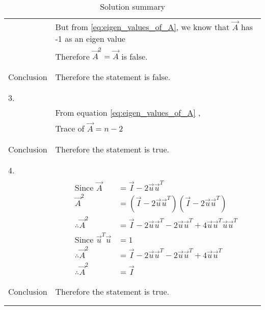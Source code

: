 \documentclass[journal,12pt]{IEEEtran}
\begin{document}
\begin{longtable}{|l|l|}
&But from \eqref{eq:eigen_values_of_A}, we know that $\vec{A}$ has -1 as an eigen value\\
&Therefore $\vec{A}^2=\vec{A}$ is false.\\
&\\
\hline
&\\
Conclusion&Therefore the statement is false.\\
&\\
\hline
&\\
3.&\\
& From equation \eqref{eq:eigen_values_of_A} ,\\
&Trace of $\vec{A}=n-2$\\
&\\
\hline
&\\
Conclusion&Therefore the statement is true.\\
&\\
\hline
&\\
4.&\\
&\parbox{6cm}{\begin{align*}
    \mbox{Since }\vec{A}&=\vec{I}-2\vec{u}\vec{u}^T\\
    \vec{A}^2&=(\vec{I}-2\vec{u}\vec{u}^T)(\vec{I}-2\vec{u}\vec{u}^T)\\
    \therefore\vec{A}^2&=\vec{I}-2\vec{u}\vec{u}^T-2\vec{u}\vec{u}^T+4\vec{u}\vec{u}^T\vec{u}\vec{u}^T\\
    \mbox{Since }\vec{u}^T\vec{u}&=1\\
    \therefore\vec{A}^2&=\vec{I}-2\vec{u}\vec{u}^T-2\vec{u}\vec{u}^T+4\vec{u}\vec{u}^T\\
    \therefore \vec{A}^2&=\vec{I}
\end{align*}}\\
&\\
\hline
&\\
Conclusion&Therefore the statement is true.\\
&\\
\hline
\caption{Solution summary}
\label{table:2}
\end{longtable}
\end{document}
